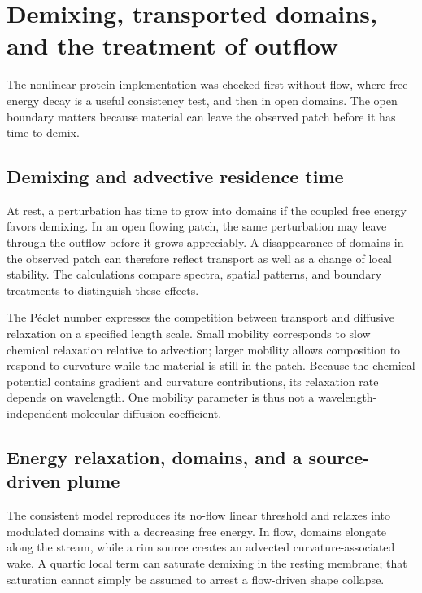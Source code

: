 \section{Demixing, transported domains, and the treatment of outflow}\label{sec:transport}
The nonlinear protein implementation was checked first without flow, where free-energy decay is a useful consistency test, and then in open domains. The open boundary matters because material can leave the observed patch before it has time to demix.


\subsection{Demixing and advective residence time}
At rest, a perturbation has time to grow into domains if the coupled free energy favors demixing. In an open flowing patch, the same perturbation may leave through the outflow before it grows appreciably. A disappearance of domains in the observed patch can therefore reflect transport as well as a change of local stability. The calculations compare spectra, spatial patterns, and boundary treatments to distinguish these effects.

The P\'eclet number expresses the competition between transport and diffusive relaxation on a specified length scale. Small mobility corresponds to slow chemical relaxation relative to advection; larger mobility allows composition to respond to curvature while the material is still in the patch. Because the chemical potential contains gradient and curvature contributions, its relaxation rate depends on wavelength. One mobility parameter is thus not a wavelength-independent molecular diffusion coefficient.


\subsection{Energy relaxation, domains, and a source-driven plume}


The consistent model reproduces its no-flow linear threshold and relaxes into modulated domains with a decreasing free energy. In flow, domains elongate along the stream, while a rim source creates an advected curvature-associated wake. A quartic local term can saturate demixing in the resting membrane; that saturation cannot simply be assumed to arrest a flow-driven shape collapse.




